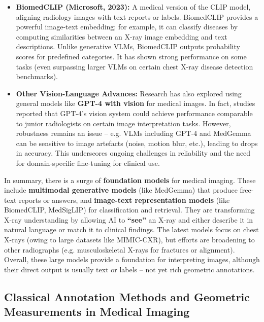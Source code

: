 \documentclass[
]{article}
\begin{document}
\begin{itemize}
  GPT-4 Vision) but with domain-specific tuning.
\item
  \textbf{BiomedCLIP (Microsoft, 2023):} A medical version of the CLIP
  model, aligning radiology images with text reports or
  labels\cite{key-12}.
  BiomedCLIP provides a powerful image-text embedding; for example, it
  can classify diseases by computing similarities between an X-ray image
  embedding and text descriptions. Unlike generative VLMs, BiomedCLIP
  outputs probability scores for predefined
  categories\cite{key-13}\cite{key-14}.
  It has shown strong performance on some tasks (even surpassing larger
  VLMs on certain chest X-ray disease detection
  benchmarks)\cite{key-15}.
\item
  \textbf{Other Vision-Language Advances:} Research has also explored
  using general models like \textbf{GPT-4 with vision} for medical
  images. In fact, studies reported that GPT-4's vision system could
  achieve performance comparable to junior radiologists on certain image
  interpretation
  tasks\cite{key-16}.
  However, robustness remains an issue -- e.g. VLMs including GPT-4 and
  MedGemma can be sensitive to image artefacts (noise, motion blur,
  etc.), leading to drops in
  accuracy\cite{key-17}\cite{key-18}.
  This underscores ongoing challenges in reliability and the need for
  domain-specific fine-tuning for clinical
  use\cite{key-19}.
\end{itemize}

In summary, there is a surge of \textbf{foundation models} for medical
imaging. These include \textbf{multimodal generative models} (like
MedGemma) that produce free-text reports or answers, and
\textbf{image-text representation models} (like BiomedCLIP, MedSigLIP)
for classification and
retrieval\cite{key-9}.
They are transforming X-ray understanding by allowing AI to
\textbf{``see''} an X-ray and either describe it in natural language or
match it to clinical findings. The latest models focus on chest X-rays
(owing to large datasets like MIMIC-CXR), but efforts are broadening to
other radiographs (e.g. musculoskeletal X-rays for fractures or
alignment)\cite{key-20}\cite{key-21}.
Overall, these large models provide a foundation for interpreting
images, although their direct output is usually text or labels -- not
yet rich geometric annotations.

\subsection{Classical Annotation Methods and Geometric Measurements in
Medical
Imaging}\label{classical-annotation-methods-and-geometric-measurements-in-medical-imaging}
\end{document}
